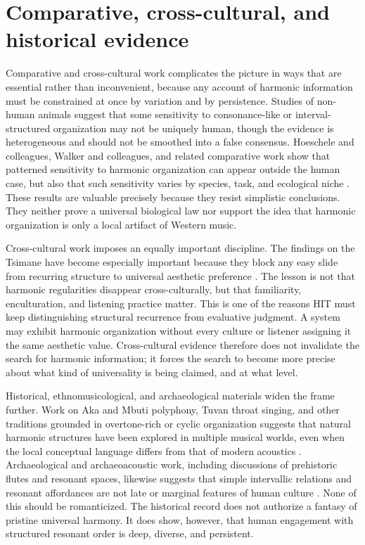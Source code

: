 \section{Comparative, cross-cultural, and historical evidence}

Comparative and cross-cultural work complicates the picture in ways that are essential rather than inconvenient, because any account of harmonic information must be constrained at once by variation and by persistence. Studies of non-human animals suggest that some sensitivity to consonance-like or interval-structured organization may not be uniquely human, though the evidence is heterogeneous and should not be smoothed into a false consensus. Hoeschele and colleagues, Walker and colleagues, and related comparative work show that patterned sensitivity to harmonic organization can appear outside the human case, but also that such sensitivity varies by species, task, and ecological niche \parencite{hoeschele_2015, walker_2019, bowling_2017, wagner_2024}. These results are valuable precisely because they resist simplistic conclusions. They neither prove a universal biological law nor support the idea that harmonic organization is only a local artifact of Western music.

Cross-cultural work imposes an equally important discipline. The findings on the Tsimane have become especially important because they block any easy slide from recurring structure to universal aesthetic preference \parencite{mcdermott_2016}. The lesson is not that harmonic regularities disappear cross-culturally, but that familiarity, enculturation, and listening practice matter. This is one of the reasons HIT must keep distinguishing structural recurrence from evaluative judgment. A system may exhibit harmonic organization without every culture or listener assigning it the same aesthetic value. Cross-cultural evidence therefore does not invalidate the search for harmonic information; it forces the search to become more precise about what kind of universality is being claimed, and at what level.

Historical, ethnomusicological, and archaeological materials widen the frame further. Work on Aka and Mbuti polyphony, Tuvan throat singing, and other traditions grounded in overtone-rich or cyclic organization suggests that natural harmonic structures have been explored in multiple musical worlds, even when the local conceptual language differs from that of modern acoustics \parencite{arom_1991, turnbull_1961, levin_2006}. Archaeological and archaeoacoustic work, including discussions of prehistoric flutes and resonant spaces, likewise suggests that simple intervallic relations and resonant affordances are not late or marginal features of human culture \parencite{conard_2009, reznikoff_dauvois, morley}. None of this should be romanticized. The historical record does not authorize a fantasy of pristine universal harmony. It does show, however, that human engagement with structured resonant order is deep, diverse, and persistent.


